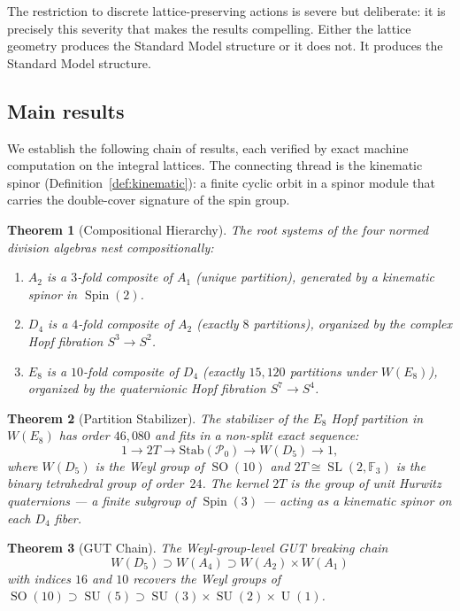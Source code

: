 \documentclass[11pt,reqno]{amsart}
\theoremstyle{plain}
\newtheorem{theorem}{Theorem}[section]
\theoremstyle{definition}
\theoremstyle{remark}
\newcommand{\F}{\mathbb{F}}
\newcommand{\Stab}{\mathrm{Stab}}
\DeclareMathOperator{\Spin}{Spin}
\DeclareMathOperator{\SO}{SO}
\DeclareMathOperator{\SU}{SU}
\DeclareMathOperator{\U}{U}
\DeclareMathOperator{\SL}{SL}
\begin{document}
The restriction to discrete lattice-preserving actions is severe
but deliberate:
it is precisely this severity that makes the results compelling.
Either the lattice geometry produces the Standard Model structure
or it does not.
It produces the Standard Model structure.


\subsection{Main results}

We establish the following chain of results, each verified by
exact machine computation on the integral lattices.
The connecting thread is the kinematic spinor
(Definition~\ref{def:kinematic}):
a finite cyclic orbit in a spinor module that carries the
double-cover signature of the spin group.

\begin{theorem}[Compositional Hierarchy]\label{thm:A}
The root systems of the four normed division algebras nest
compositionally:
\begin{enumerate}[label=(\alph*)]
\item $A_2$ is a $3$-fold composite of $A_1$ (unique partition),
  generated by a kinematic spinor in $\Spin(2)$.
\item $D_4$ is a $4$-fold composite of $A_2$ (exactly $8$
  partitions), organized by the complex Hopf fibration
  $S^3 \to S^2$.
\item $E_8$ is a $10$-fold composite of $D_4$ (exactly $15{,}120$
  partitions under $W(E_8)$), organized by the quaternionic
  Hopf fibration $S^7 \to S^4$.
\end{enumerate}
\end{theorem}

\begin{theorem}[Partition Stabilizer]\label{thm:B}
The stabilizer of the $E_8$ Hopf partition in $W(E_8)$ has order
$46{,}080$ and fits in a non-split exact sequence:
\[
  1 \to 2T \to \Stab(\mathcal{P}_0) \to W(D_5) \to 1,
\]
where $W(D_5)$ is the Weyl group of $\SO(10)$ and
$2T \cong \SL(2,\F_3)$ is the binary tetrahedral group of
order~$24$.
The kernel $2T$ is the group of unit Hurwitz quaternions ---
a finite subgroup of $\Spin(3)$ --- acting as a kinematic spinor
on each $D_4$ fiber.
\end{theorem}

\begin{theorem}[GUT Chain]\label{thm:C}
The Weyl-group-level GUT breaking chain
\[
  W(D_5) \supset W(A_4) \supset W(A_2)\times W(A_1)
\]
with indices $16$ and $10$ recovers the Weyl groups of
$\SO(10) \supset \SU(5) \supset \SU(3)\times\SU(2)\times\U(1)$.
\end{theorem}
\end{document}
